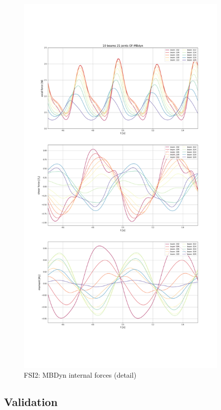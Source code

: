 \begin{figure}[htbp!]
	\centering
	\includegraphics[width=0.92\textwidth, trim=0 230 0 230, clip]{images/FSI2/FSI2_OF-MBDyn_act.png}
	\caption{FSI2: MBDyn internal forces (detail)}
	\label{fig:FSI2_mbd_internal}
\end{figure}


\subsection{Validation}

